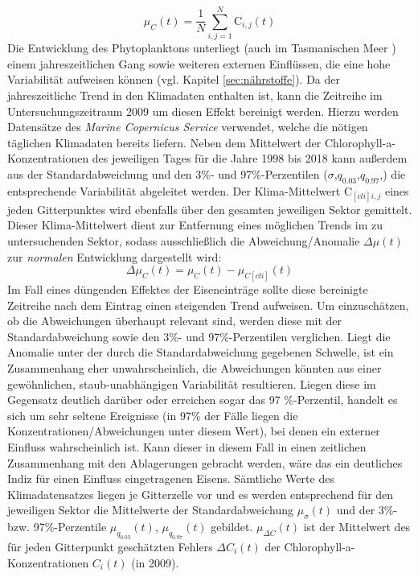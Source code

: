 \documentclass[12pt,a4paper,onecolumn]{scrartcl}
\begin{document}
\begin{equation}
\mu_C(t) = \frac{1}{N}\sum\limits_{i,j=1}^{N} \text{C}_{i,j}(t)
\end{equation}
Die Entwicklung des Phytoplanktons unterliegt (auch im Tasmanischen Meer \citep{Tilburg.2002}) einem jahreszeitlichen Gang sowie weiteren externen Einflüssen, die eine hohe Variabilität aufweisen können (vgl. Kapitel \ref{sec:nährstoffe}). Da der jahreszeitliche Trend in den Klimadaten enthalten ist, kann die Zeitreihe im Untersuchungszeitraum 2009 um diesen Effekt bereinigt werden. Hierzu werden Datensätze des \textit{Marine Copernicus Service} verwendet, welche die nötigen täglichen Klimadaten bereits liefern. Neben dem Mittelwert der Chlorophyll-a-Konzentrationen des jeweiligen Tages für die Jahre 1998 bis 2018 kann außerdem aus der Standardabweichung und den 3\%- und 97\%-Perzentilen ($\sigma$,$q_{0.03}$,$q_{0.97}$,) die entsprechende Variabilität abgeleitet werden. Der Klima-Mittelwert $\text{C}_{[cli]i,j}$ eines jeden Gitterpunktes wird ebenfalls über den gesamten jeweiligen Sektor gemittelt. Dieser Klima-Mittelwert dient zur Entfernung eines möglichen Trends im zu untersuchenden Sektor, sodass ausschließlich die Abweichung/Anomalie $\Delta \mu(t)$ zur \textit{normalen} Entwicklung dargestellt wird:
\begin{equation}
\Delta \mu_C(t) = \mu_C(t) - \mu_{C[cli]}(t) \label{eq:cli_anomalie}
\end{equation} 
Im Fall eines düngenden Effektes der Eiseneinträge sollte diese bereinigte Zeitreihe nach dem Eintrag einen steigenden Trend aufweisen. Um einzuschätzen, ob die Abweichungen überhaupt relevant sind, werden diese mit der Standardabweichung sowie den 3\%- und 97\%-Perzentilen verglichen. Liegt die Anomalie unter der durch die Standardabweichung gegebenen Schwelle, ist ein Zusammenhang eher unwahrscheinlich, die Abweichungen könnten aus einer gewöhnlichen, staub-unabhängigen Variabilität resultieren. Liegen diese im Gegensatz deutlich darüber oder erreichen sogar das 97 \%-Perzentil, handelt es sich um sehr seltene Ereignisse (in 97\% der Fälle liegen die Konzentrationen/Abweichungen unter diesem Wert), bei denen ein externer Einfluss wahrscheinlich ist. Kann dieser in diesem Fall in einen zeitlichen Zusammenhang mit den Ablagerungen gebracht werden, wäre das ein deutliches Indiz für einen Einfluss eingetragenen Eisens. Sämtliche Werte des Klimadatensatzes liegen je Gitterzelle vor und es werden entsprechend für den jeweiligen Sektor die Mittelwerte der Standardabweichung $\mu_\sigma (t)$ und der 3\%- bzw. 97\%-Perzentile  $\mu_{q_{0.03}}(t)$, $\mu_{q_{0.97}}(t)$ gebildet. $\mu_{\Delta C}(t)$ ist der Mittelwert des für jeden Gitterpunkt geschätzten Fehlers $ \Delta C_i(t)$ der Chlorophyll-a-Konzentrationen $C_i(t)$ (in 2009).
\end{document}
